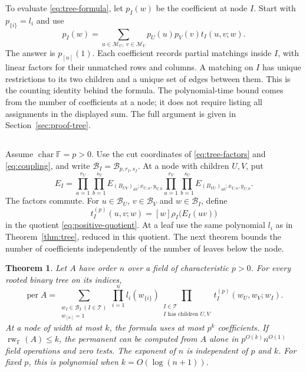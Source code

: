 \documentclass[11pt,reqno]{amsart}
\newtheorem{theorem}{Theorem}[section]
\theoremstyle{remark}
\numberwithin{equation}{section}
\newcommand{\per}{\operatorname{per}}
\newcommand{\F}{\mathbb F}
\begin{document}
To evaluate \eqref{eq:tree-formula}, let \(p_I(w)\) be the
coefficient at node \(I\). Start with \(p_{\{i\}}=l_i\) and use
\[
 p_I(w)=\sum_{u\in\mathcal M_U,\ v\in\mathcal M_V}
             p_U(u)p_V(v)t_I(u,v;w).
\]
The answer is \(p_{[n]}(1)\). Each coefficient records partial
matchings inside \(I\), with linear factors for their unmatched
rows and columns. A matching on \(I\) has unique restrictions to
its two children and a unique set of edges between them. This is
the counting identity behind the formula. The polynomial-time
bound comes from the number of coefficients at a node; it does
not require listing all assignments in the displayed sum.
The full argument is given in Section~\ref{sec:proof-tree}.

\subsection{}

Assume \(\operatorname{char}\F=p>0\). Use the cut coordinates of
\eqref{eq:tree-factors} and \eqref{eq:coupling}, and write
\(\mathcal B_I=\mathcal B_{p,r_I,s_I}\). At a node with children
\(U,V\), put
\[
 E_I=
 \prod_{a=1}^{r_U}\prod_{b=1}^{s_V}
 E_{(B_{UV})_{ab};x_{U,a},y_{V,b}}
 \prod_{a=1}^{r_V}\prod_{b=1}^{s_U}
 E_{(B_{VU})_{ab};x_{V,a},y_{U,b}}.
\]
The factors commute. For \(u\in\mathcal B_U\),
\(v\in\mathcal B_V\) and \(w\in\mathcal B_I\), define
\[
 t_I^{(p)}(u,v;w)=[w]\rho_I\bigl(E_I(uv)\bigr)
\]
in the quotient \eqref{eq:positive-quotient}. At a leaf use the
same polynomial \(l_i\) as in Theorem~\ref{thm:tree}, reduced in
this quotient. The next theorem bounds the number of coefficients
independently of the number of leaves below the node.

\begin{theorem}\label{thm:positive}
Let \(A\) have order \(n\) over a field of characteristic \(p>0\).
For every rooted binary tree on its indices,
\begin{equation}\label{eq:positive-tree}
 \per A=
 \sum_{\substack{w_I\in\mathcal B_I\ (I\in\mathcal T)\\w_{[n]}=1}}
 \prod_{i=1}^n l_i(w_{\{i\}})
 \prod_{\substack{I\in\mathcal T\\I\text{ has children }U,V}}
                t_I^{(p)}(w_U,w_V;w_I).
\end{equation}
At a node of width at most \(k\), the formula uses at most
\(p^k\) coefficients. If \(\operatorname{rw}_{\F}(A)\leq k\),
the permanent can be computed from \(A\) alone in
\(p^{O(k)}n^{O(1)}\) field operations and zero tests. The
exponent of \(n\) is independent of \(p\) and \(k\).
For fixed \(p\), this is polynomial when
\(k=O(\log(n+1))\).
\end{theorem}
\end{document}
